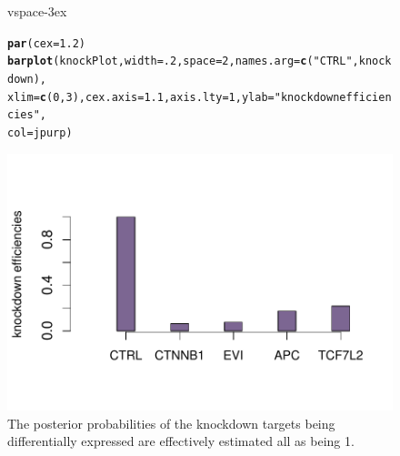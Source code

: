 \documentclass[a4paper]{article}\usepackage[]{graphicx}\usepackage[]{color}
\makeatletter
\def\maxwidth{ %
  \ifdim\Gin@nat@width>\linewidth
    \linewidth
  \else
    \Gin@nat@width
  \fi
}
\newcommand{\hlnum}[1]{\textcolor[rgb]{0.686,0.059,0.569}{#1}}%
\newcommand{\hlstr}[1]{\textcolor[rgb]{0.192,0.494,0.8}{#1}}%
\newcommand{\hlstd}[1]{\textcolor[rgb]{0.345,0.345,0.345}{#1}}%
\newcommand{\hlkwc}[1]{\textcolor[rgb]{0.333,0.667,0.333}{#1}}%
\newcommand{\hlkwd}[1]{\textcolor[rgb]{0.737,0.353,0.396}{\textbf{#1}}}%
\newenvironment{kframe}{%
 \def\at@end@of@kframe{}%
 \ifinner\ifhmode%
  \def\at@end@of@kframe{\end{minipage}}%
  \begin{minipage}{\columnwidth}%
 \fi\fi%
 \def\FrameCommand##1{\hskip\@totalleftmargin \hskip-\fboxsep
 \colorbox{shadecolor}{##1}\hskip-\fboxsep
     \hskip-\linewidth \hskip-\@totalleftmargin \hskip\columnwidth}%
 \MakeFramed {\advance\hsize-\width
   \@totalleftmargin\z@ \linewidth\hsize
   \@setminipage}}%
 {\par\unskip\endMakeFramed%
 \at@end@of@kframe}
\newenvironment{knitrout}{}{} %
\makeatother
\begin{document}
\begin{figure}[htbp]
\begin{center}
vspace{-3ex}
\begin{knitrout}
\color{fgcolor}\begin{kframe}
\begin{alltt}
\hlkwd{par}\hlstd{(}\hlkwc{cex}\hlstd{=}\hlnum{1.2}\hlstd{)}
\hlkwd{barplot}\hlstd{(knockPlot,} \hlkwc{width}\hlstd{=}\hlnum{.2}\hlstd{,} \hlkwc{space}\hlstd{=}\hlnum{2}\hlstd{,} \hlkwc{names.arg}\hlstd{=}\hlkwd{c}\hlstd{(}\hlstr{"CTRL"}\hlstd{,knockdown),}
        \hlkwc{xlim}\hlstd{=}\hlkwd{c}\hlstd{(}\hlnum{0}\hlstd{,}\hlnum{3}\hlstd{),} \hlkwc{cex.axis}\hlstd{=}\hlnum{1.1}\hlstd{,} \hlkwc{axis.lty}\hlstd{=}\hlnum{1}\hlstd{,} \hlkwc{ylab}\hlstd{=}\hlstr{"knockdown efficiencies"}\hlstd{,}
        \hlkwc{col}\hlstd{=jpurp)}
\end{alltt}
\end{kframe}
\includegraphics[width=\maxwidth]{figure/Efficiency_barplot} 

\end{knitrout}
\caption{The posterior probabilities of the knockdown targets being differentially expressed are effectively estimated all as being 1.}
\end{center}
\end{figure}
\end{document}
